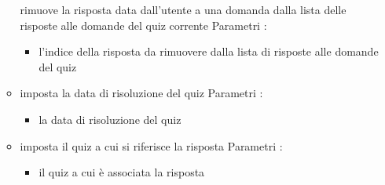 \begin{itemize}
\begin{itemize}
rimuove la risposta data dall'utente a una domanda dalla lista delle risposte alle domande del quiz corrente
\newline
Parametri :
\begin{itemize}
\item {}
\newline
l'indice della risposta da rimuovere dalla lista di risposte alle domande del quiz
\end{itemize}
\item {}
\newline
imposta la data di risoluzione del quiz
\newline
Parametri :
\begin{itemize}
\item {}
\newline
la data di risoluzione del quiz
\end{itemize}
\item {}
\newline
imposta il quiz a cui si riferisce la risposta
\newline
Parametri :
\begin{itemize}
\item {}
\newline
il quiz a cui è associata la risposta
\end{itemize}
\end{itemize}
\end{itemize}
